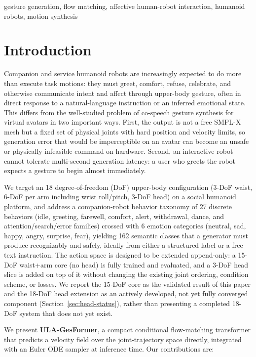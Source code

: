 \documentclass[conference]{IEEEtran}
\begin{document}
\begin{IEEEkeywords}
gesture generation, flow matching, affective human-robot interaction, humanoid robots, motion synthesis
\end{IEEEkeywords}

\section{Introduction}
\label{sec:intro}

Companion and service humanoid robots are increasingly expected to do
more than execute task motions: they must greet, comfort, refuse,
celebrate, and otherwise communicate intent and affect through
upper-body gesture, often in direct response to a natural-language
instruction or an inferred emotional state. This differs from the
well-studied problem of co-speech gesture synthesis for virtual avatars
in two important ways. First, the output is not a free SMPL-X mesh but a
fixed set of physical joints with hard position and velocity limits, so
generation error that would be imperceptible on an avatar can become an
unsafe or physically infeasible command on hardware. Second, an
interactive robot cannot tolerate multi-second generation latency: a
user who greets the robot expects a gesture to begin almost immediately.

We target an 18 degree-of-freedom (DoF) upper-body configuration
(3-DoF waist, 6-DoF per arm including wrist roll/pitch, 3-DoF head) on
a social humanoid platform, and address a companion-robot behavior
taxonomy of 27 discrete behaviors (idle, greeting, farewell, comfort,
alert, withdrawal, dance, and attention/search/error families) crossed
with 6 emotion categories (neutral, sad, happy, angry, surprise, fear),
yielding 162 semantic classes that a generator must produce
recognizably and safely, ideally from either a structured label or a
free-text instruction. The action space is designed to be extended
append-only: a 15-DoF waist+arm core (no head) is fully trained and
evaluated, and a 3-DoF head slice is added on top of it without
changing the existing joint ordering, condition scheme, or losses. We
report the 15-DoF core as the validated result of this paper and the
18-DoF head extension as an actively developed, not yet fully
converged component (Section~\ref{sec:head-status}), rather than
presenting a completed 18-DoF system that does not yet exist.

We present \textbf{ULA-GesFormer}, a compact conditional flow-matching
transformer that predicts a velocity field over the joint-trajectory
space directly, integrated with an Euler ODE sampler at inference time.
Our contributions are:
\end{document}
